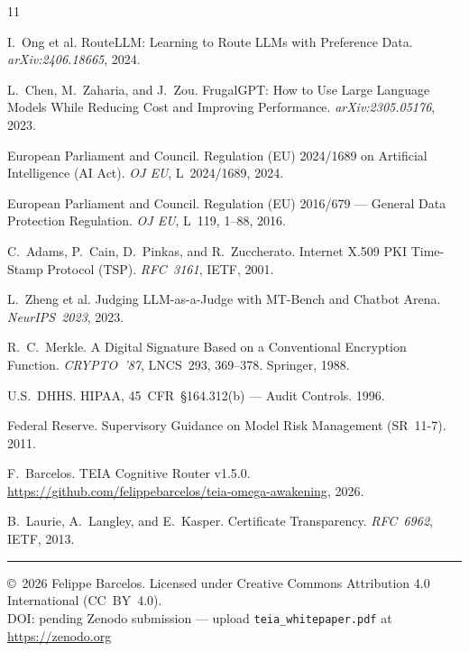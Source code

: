 \documentclass[11pt,a4paper]{article}
\begin{document}
\begin{thebibliography}{11}

I.~Ong et al.
RouteLLM: Learning to Route LLMs with Preference Data.
\textit{arXiv:2406.18665}, 2024.

L.~Chen, M.~Zaharia, and J.~Zou.
FrugalGPT: How to Use Large Language Models While Reducing Cost and Improving
Performance.
\textit{arXiv:2305.05176}, 2023.

European Parliament and Council.
Regulation (EU) 2024/1689 on Artificial Intelligence (AI Act).
\textit{OJ EU}, L~2024/1689, 2024.

European Parliament and Council.
Regulation (EU) 2016/679 --- General Data Protection Regulation.
\textit{OJ EU}, L~119, 1--88, 2016.

C.~Adams, P.~Cain, D.~Pinkas, and R.~Zuccherato.
Internet X.509 PKI Time-Stamp Protocol (TSP).
\textit{RFC~3161}, IETF, 2001.

L.~Zheng et al.
Judging LLM-as-a-Judge with MT-Bench and Chatbot Arena.
\textit{NeurIPS~2023}, 2023.

R.~C.~Merkle.
A Digital Signature Based on a Conventional Encryption Function.
\textit{CRYPTO~'87}, LNCS~293, 369--378. Springer, 1988.

U.S.\ DHHS.
HIPAA, 45~CFR~\S164.312(b) --- Audit Controls. 1996.

Federal Reserve.
Supervisory Guidance on Model Risk Management (SR~11-7). 2011.

F.~Barcelos.
TEIA Cognitive Router v1.5.0.
\url{https://github.com/felippebarcelos/teia-omega-awakening}, 2026.

B.~Laurie, A.~Langley, and E.~Kasper.
Certificate Transparency.
\textit{RFC~6962}, IETF, 2013.

\end{thebibliography}

\bigskip
\noindent\rule{\textwidth}{0.4pt}

\noindent\small
\copyright\ 2026 Felippe Barcelos.
Licensed under Creative Commons Attribution 4.0 International (CC~BY~4.0).\\
DOI: pending Zenodo submission --- upload \texttt{teia\_whitepaper.pdf} at
\url{https://zenodo.org}
\end{document}
